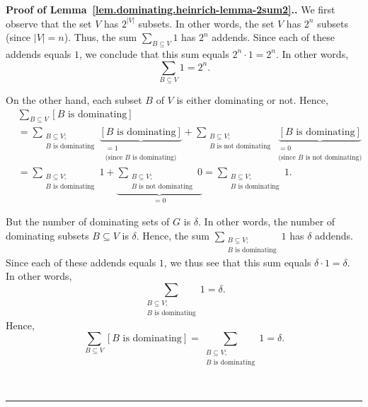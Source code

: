 \documentclass[numbers=enddot,12pt,final,onecolumn,notitlepage]{scrartcl}%
\theoremstyle{definition}
\newenvironment{proof}[1][Proof]{\noindent\textbf{#1.} }{\ \rule{0.5em}{0.5em}}
\let\sumnonlimits\sum
\renewcommand{\sum}{\sumnonlimits\limits}
\newcommand{\abs}[1]{\left| #1 \right|}
\newcommand{\ive}[1]{\left[ #1 \right]}
\begin{document}
\begin{proof}[Proof of
Lemma~\ref{lem.dominating.heinrich-lemma-2sum2}.]
We first observe that the set $V$ has $2^{\abs{V}}$ subsets. In other
words, the set $V$ has $2^n$ subsets (since $\abs{V} = n$). Thus, the
sum $\sum_{B \subseteq V} 1$ has $2^n$ addends. Since each of these
addends equals $1$, we conclude that this sum equals $2^n \cdot 1
= 2^n$. In other words,
\begin{equation}
\sum_{B \subseteq V} 1 = 2^n .
\label{pf.lem.dominating.heinrich-lemma-2sum2.1}
\end{equation}

On the other hand, each subset $B$ of $V$ is either dominating or not.
Hence,
\begin{align*}
& \sum_{B \subseteq V} \ive{B \text{ is dominating}}  \\
&=
\sum_{\substack{B \subseteq V; \\ B \text{ is dominating}}}
    \underbrace{\ive{B \text{ is dominating}}}_{\substack{
                 = 1 \\ \text{(since } B \text{ is dominating)}}}
+ \sum_{\substack{B \subseteq V; \\ B \text{ is not dominating}}}
    \underbrace{\ive{B \text{ is dominating}}}_{\substack{
                 = 0 \\ \text{(since } B \text{ is not dominating)}}}
 \\
&=
\sum_{\substack{B \subseteq V; \\ B \text{ is dominating}}}
    1
+ \underbrace{
  \sum_{\substack{B \subseteq V; \\ B \text{ is not dominating}}}
    0}_{=0}
=
\sum_{\substack{B \subseteq V; \\ B \text{ is dominating}}} 1 .
\end{align*}

But the number of dominating sets of $G$ is $\delta$. In other words,
the number of dominating subsets $B \subseteq V$ is $\delta$. Hence,
the sum
$\sum_{\substack{B \subseteq V; \\ B \text{ is dominating}}} 1$
has $\delta$ addends. Since each of these addends equals $1$, we thus
see that this sum equals $\delta \cdot 1 = \delta$. In other words,
\[
\sum_{\substack{B \subseteq V; \\ B \text{ is dominating}}} 1
= \delta .
\]
Hence,
\begin{equation}
\sum_{B \subseteq V} \ive{B \text{ is dominating}}
= \sum_{\substack{B \subseteq V; \\ B \text{ is dominating}}} 1
= \delta .
\label{pf.lem.dominating.heinrich-lemma-2sum2.2}
\end{equation}


\end{proof}
\end{document}
